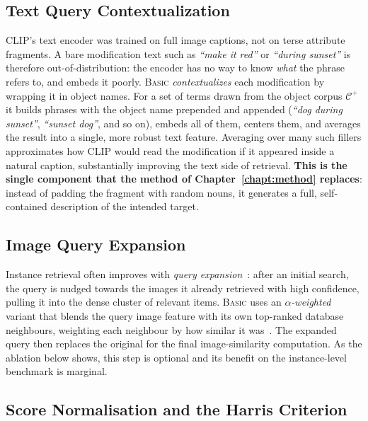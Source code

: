 \subsection{Text Query Contextualization}\label{sect:rel_basic_context}

CLIP's text encoder was trained on full image captions, not on terse attribute
fragments. A bare modification text such as \emph{``make it red''} or
\emph{``during sunset''} is therefore out-of-distribution: the encoder has no way
to know \emph{what} the phrase refers to, and embeds it poorly. \textsc{Basic}
\emph{contextualizes} each modification by wrapping it in object names. For a set
of terms drawn from the object corpus $\mathcal{C}^{+}$ it builds phrases with the
object name prepended and appended (\emph{``dog during sunset''}, \emph{``sunset
dog''}, and so on), embeds all of them, centers them, and averages the result into
a single, more robust text feature. Averaging over many such fillers approximates
how CLIP would read the modification if it appeared inside a natural caption,
substantially improving the text side of retrieval. \textbf{This is the single
component that the method of Chapter~\ref{chapt:method} replaces}: instead of
padding the fragment with random nouns, it generates a full, self-contained
description of the intended target.

\subsection{Image Query Expansion}\label{sect:rel_basic_qe}

Instance retrieval often improves with \emph{query
expansion}~\cite{chum2007totalrecall,gordo2020attqe}: after an initial search,
the query is nudged towards the images it already retrieved with high
confidence, pulling it into the dense cluster of relevant items. \textsc{Basic}
uses an \emph{$\alpha$-weighted} variant that blends the query image feature with
its own top-ranked database neighbours, weighting each neighbour by how similar it
was~\cite{gordo2020attqe}. The expanded query then replaces the original for
the final image-similarity computation. As the ablation below shows, this step is
optional and its benefit on the instance-level benchmark is marginal.

\subsection{Score Normalisation and the Harris Criterion}\label{sect:rel_basic_harris}

